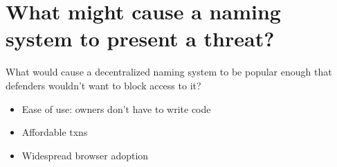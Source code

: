 \documentclass[10pt,sigconf,letterpaper]{acmart}
\begin{document}
\section{What might cause a naming system to present a threat?}

What would cause a decentralized naming system to be popular enough that 
defenders wouldn't want to block access to it?
\begin{itemize}
	\item Ease of use: owners don't have to write code
	\item Affordable txns
	\item Widespread browser adoption
\end{itemize}

%
%
%
%
%
\end{document}

